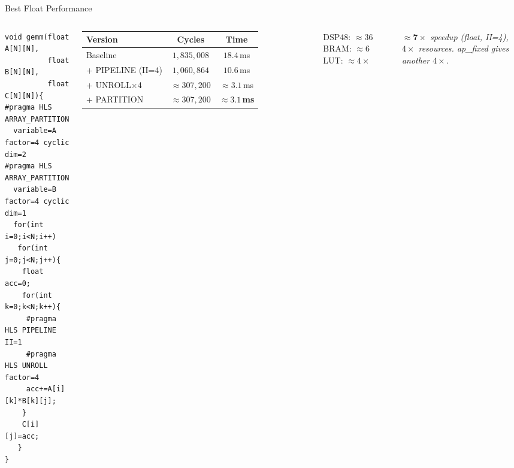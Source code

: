 \documentclass[aspectratio=169,12pt]{beamer}
\begin{document}
\begin{frame}[fragile]{Best Float Performance}
\vspace{0.1cm}
\begin{columns}[T,totalwidth=\textwidth]
\begin{lstlisting}[basicstyle=\ttfamily\scriptsize]
void gemm(float A[N][N],
          float B[N][N],
          float C[N][N]){
#pragma HLS ARRAY_PARTITION
  variable=A factor=4 cyclic dim=2
#pragma HLS ARRAY_PARTITION
  variable=B factor=4 cyclic dim=1
  for(int i=0;i<N;i++)
   for(int j=0;j<N;j++){
    float acc=0;
    for(int k=0;k<N;k++){
     #pragma HLS PIPELINE II=1
     #pragma HLS UNROLL factor=4
     acc+=A[i][k]*B[k][j];
    }
    C[i][j]=acc;
   }
}
\end{lstlisting}

  \vspace{0.2cm}
  \begin{tabular}{p{2.6cm}cc}
    \hline
    \rowcolor{Navy!10}\textbf{Version} & \textbf{Cycles} & \textbf{Time}\\
    \hline
    Baseline                  & $1{,}835{,}008$ & $18.4$\,ms\\
    \rowcolor{Navy!5}+ PIPELINE (II=4) & $1{,}060{,}864$ & $10.6$\,ms\\
    + UNROLL$\times$4         & $\approx 307{,}200$ & $\approx 3.1$\,ms\\
    \rowcolor{Navy!5}+ PARTITION       & \textbf{\color{Teal}$\approx 307{,}200$} & \textbf{\color{Teal}$\approx 3.1$\,ms}\\
    \hline
  \end{tabular}

  \vspace{10pt}
  \colorbox{Navy!8}{\parbox{\dimexpr\linewidth-2\fboxsep\relax}{\vspace{4pt}
    {\small DSP48: $\approx$36 \quad BRAM: $\approx$6 \quad LUT: $\approx4\times$}
  \vspace{4pt}}}

  \vspace{6pt}
  {\small\color{Navy!70}\itshape $\mathbf{{\approx}7\times}$ speedup (float, II=4), $4\times$ resources. ap\_fixed gives another $4\times$.}
\end{columns}
\end{frame}
\end{document}
